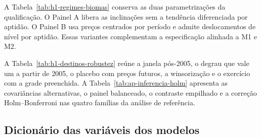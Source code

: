 
\FloatBarrier

A Tabela~\ref{tab:h1-regimes-biomas} conserva as duas parametrizações da qualificação. O Painel A libera as inclinações sem a tendência diferenciada por aptidão. O Painel B usa preços centrados por período e admite deslocamentos de nível por aptidão. Essas variantes complementam a especificação alinhada a M1 e M2.


\FloatBarrier

A Tabela~\ref{tab:h1-destinos-robustez} reúne a janela pós-2005, o degrau que vale um a partir de 2005, o placebo com preços futuros, a winsorização e o exercício com a grade preenchida. A Tabela~\ref{tab:ap-inferencia-holm} apresenta as covariâncias alternativas, o painel balanceado, o contraste empilhado e a correção Holm--Bonferroni nas quatro famílias da análise de referência.


\FloatBarrier


\FloatBarrier

\subsection{Dicionário das variáveis dos modelos}
\label{ap:dicionario-h1}


